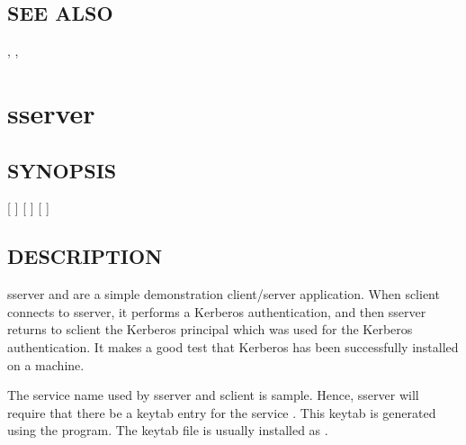 \documentclass[letterpaper,10pt,english]{sphinxmanual}
\begin{document}
\subsection{SEE ALSO}
\label{\detokenize{admin/admin_commands/k5srvutil:see-also}}
\sphinxAtStartPar
{\hyperref[\detokenize{admin/admin_commands/kadmin_local:kadmin-1}]{}}, {\hyperref[\detokenize{admin/admin_commands/ktutil:ktutil-1}]{}}, 


\section{sserver}
\label{\detokenize{admin/admin_commands/sserver:sserver}}\label{\detokenize{admin/admin_commands/sserver:sserver-8}}\label{\detokenize{admin/admin_commands/sserver::doc}}

\subsection{SYNOPSIS}
\label{\detokenize{admin/admin_commands/sserver:synopsis}}
\sphinxAtStartPar
{}
{[}   {]}
{[}   {]}
{[}  {]}


\subsection{DESCRIPTION}
\label{\detokenize{admin/admin_commands/sserver:description}}
\sphinxAtStartPar
sserver and  are a simple demonstration client/server
application.  When sclient connects to sserver, it performs a Kerberos
authentication, and then sserver returns to sclient the Kerberos
principal which was used for the Kerberos authentication.  It makes a
good test that Kerberos has been successfully installed on a machine.

\sphinxAtStartPar
The service name used by sserver and sclient is sample.  Hence,
sserver will require that there be a keytab entry for the service
.  This keytab is generated
using the {\hyperref[\detokenize{admin/admin_commands/kadmin_local:kadmin-1}]{}} program.  The keytab file is usually
installed as {\hyperref[\detokenize{mitK5defaults:paths}]{}}.
\end{document}

